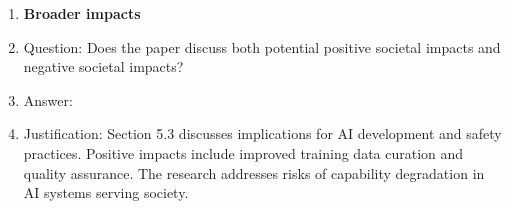 \documentclass{article}
\begin{document}
\begin{enumerate}
\item {\bf Broader impacts}
    \item[] Question: Does the paper discuss both potential positive societal impacts and negative societal impacts?
    \item[] Answer: \answerYes{}
    \item[] Justification: Section 5.3 discusses implications for AI development and safety practices. Positive impacts include improved training data curation and quality assurance. The research addresses risks of capability degradation in AI systems serving society.

\end{enumerate}
\end{document}
